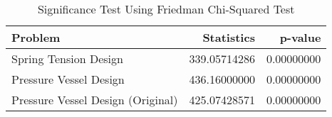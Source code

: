 \begin{table}
\centering
\caption{Significance Test Using Friedman Chi-Squared Test}
\label{friedman_test}
\begin{tabular}{lrr}
\toprule
                          Problem &   Statistics &    p-value \\
\midrule
            Spring Tension Design & 339.05714286 & 0.00000000 \\
           Pressure Vessel Design & 436.16000000 & 0.00000000 \\
Pressure Vessel Design (Original) & 425.07428571 & 0.00000000 \\
\bottomrule
\end{tabular}
\end{table}
